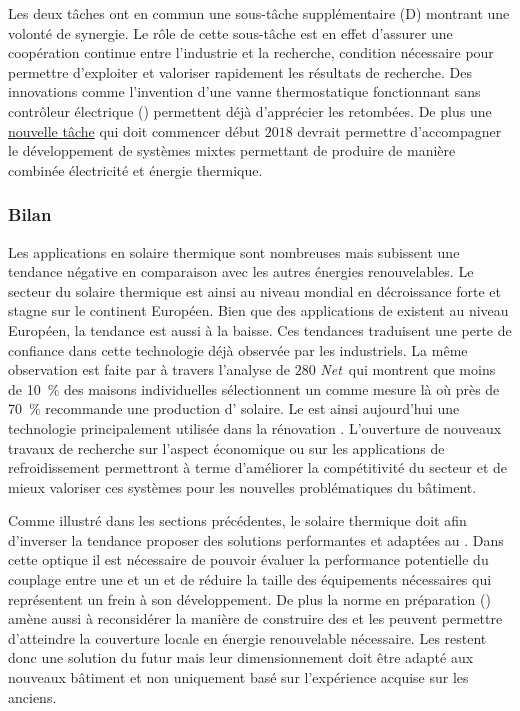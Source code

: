 Les deux tâches ont en commun une sous-tâche supplémentaire (D) montrant une volonté
de synergie. Le rôle de cette sous-tâche est en effet d’assurer une coopération
continue entre l’industrie et la recherche, condition nécessaire
pour permettre d’exploiter et valoriser rapidement les résultats de recherche.
Des innovations comme l’invention d’une vanne thermostatique fonctionnant
sans contrôleur électrique ()
permettent déjà d’apprécier les retombées.
De plus une \href{http://www.iea-shc.org/article?NewsID=173}{nouvelle tâche} qui doit
commencer début $2018$ devrait permettre d’accompagner le développement de systèmes mixtes
permettant de produire de manière combinée électricité et énergie thermique.


\subsubsection{Bilan} %
\label{ssub:bilan_evolution}
Les applications en solaire thermique sont nombreuses mais subissent
une tendance négative en comparaison avec les autres énergies renouvelables. Le
secteur du solaire thermique est ainsi au niveau mondial en décroissance forte et stagne
sur le continent Européen. Bien que des applications de  existent au niveau
Européen, la tendance est aussi à la baisse. Ces tendances traduisent une perte de
confiance dans cette technologie déjà observée par les industriels. La même observation
est faite par \textcite{Musall2010} à travers l’analyse de $280$ \textit{Net}\, qui
montrent que moins de \SI{10}{\percent} des maisons individuelles sélectionnent un 
comme mesure là où près de \SI{70}{\percent} recommande une production d’
solaire. Le  est ainsi aujourd’hui une technologie principalement utilisée dans la rénovation
\parencite{Ellehauge2003}. L’ouverture de nouveaux travaux de recherche
sur l’aspect économique ou sur les applications de refroidissement
permettront à terme d’améliorer la compétitivité du secteur et de mieux valoriser ces systèmes pour les nouvelles
problématiques du bâtiment.

Comme illustré dans les sections précédentes, le solaire thermique doit
afin d’inverser la tendance proposer des solutions performantes et adaptées au .
Dans cette optique il est nécessaire de pouvoir évaluer la performance potentielle
du couplage entre une  et un  et de réduire la taille des équipements
nécessaires qui représentent un frein à son développement.
De plus la norme en préparation () amène aussi à reconsidérer la manière
de construire des  et les  peuvent permettre d’atteindre la couverture
locale en énergie renouvelable nécessaire.
Les  restent donc une solution du futur mais leur dimensionnement doit être adapté
aux nouveaux bâtiment et non uniquement basé sur l’expérience acquise sur les anciens.


